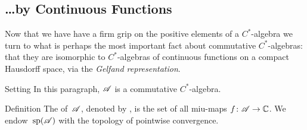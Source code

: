 \documentclass[a]{subfiles}
\begin{document}
\subsection{\dots by Continuous Functions}
\begin{parsec}%
\begin{point}%
Now that we have have a firm grip
on the positive elements of a $C^*$-algebra
we turn to what is perhaps the most important
fact about commutative $C^*$-algebras:
that they are isomorphic to $C^*$-algebras
of continuous functions on a compact Hausdorff space,
via the \emph{Gelfand representation}.
\end{point}
\begin{point}{Setting}%
In this paragraph,
$\mathscr{A}$ is a commutative $C^*$-algebra.
\end{point}
\begin{point}{Definition}%
The  of~$\mathscr{A}$,
denoted by \Define{$\spec(\scrA)$},
is the set of all miu-maps $f\colon \mathscr{A}\to \mathbb{C}$.
We endow~$\spec(\scrA)$
with the topology of pointwise convergence.


\end{point}
\end{parsec}
\end{document}
